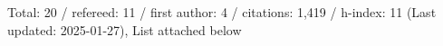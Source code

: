 Total: 20 / refereed: 11 / first author: 4 / citations: 1,419 / h-index: 11 (Last updated: 2025-01-27), List attached below